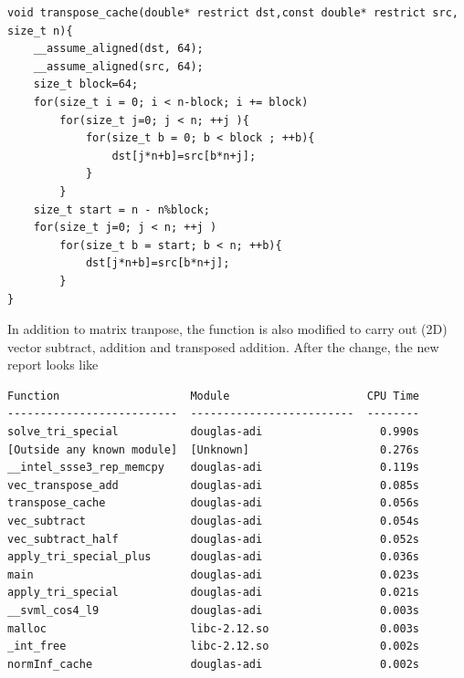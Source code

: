 \documentclass[a4paper,11pt]{article}
\begin{document}
\begin{minipage}{\textwidth}
\begin{verbatim}
void transpose_cache(double* restrict dst,const double* restrict src, size_t n){
    __assume_aligned(dst, 64);
    __assume_aligned(src, 64);
    size_t block=64;
    for(size_t i = 0; i < n-block; i += block)
        for(size_t j=0; j < n; ++j ){
            for(size_t b = 0; b < block ; ++b){
                dst[j*n+b]=src[b*n+j];
            }
        }
    size_t start = n - n%block;
    for(size_t j=0; j < n; ++j )
        for(size_t b = start; b < n; ++b){
            dst[j*n+b]=src[b*n+j];
        }
}	
\end{verbatim}
\end{minipage}
\vspace{1mm}
\par
In addition to matrix tranpose, the function is also modified to carry out (2D) vector subtract, addition and transposed addition. After the change, the new report looks like
\\
\noindent \begin{minipage}{\textwidth}
	\begin{framed}
		\begin{center}
			\begin{verbatim}
Function                    Module                     CPU Time 
--------------------------  -------------------------  -------- 
solve_tri_special           douglas-adi                  0.990s                                              
[Outside any known module]  [Unknown]                    0.276s                                              
__intel_ssse3_rep_memcpy    douglas-adi                  0.119s                                              
vec_transpose_add           douglas-adi                  0.085s                                               
transpose_cache             douglas-adi                  0.056s                                              
vec_subtract                douglas-adi                  0.054s                                              
vec_subtract_half           douglas-adi                  0.052s                                              
apply_tri_special_plus      douglas-adi                  0.036s                                              
main                        douglas-adi                  0.023s                                              
apply_tri_special           douglas-adi                  0.021s                                              
__svml_cos4_l9              douglas-adi                  0.003s                                              
malloc                      libc-2.12.so                 0.003s                                              
_int_free                   libc-2.12.so                 0.002s                                              
normInf_cache               douglas-adi                  0.002s                                              
			\end{verbatim}	
		\end{center}
	\end{framed}
\end{minipage}
\end{document}
